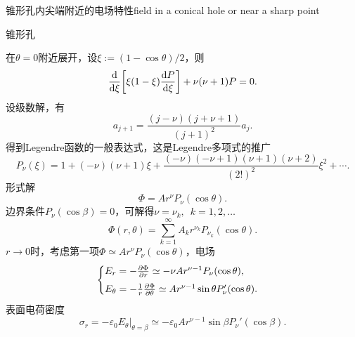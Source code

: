 \begin{example}{锥形孔内尖端附近的电场特性}{field in a conical hole or near a sharp point}
    \begin{center}
        \tikzchap 锥形孔
    \end{center}
    在$\theta=0$附近展开，设$\xi:=(1-\cos\theta)/2$，则 
    \[
        \dd\xi\biggfkh{\xi(1-\xi)\dv P\xi}+\nu(\nu+1)P=0.
    \]
    设级数解，有
    \[
        a_{j+1}=\frac{(j-\nu)(j+\nu+1)}{(j+1)^2}a_j.
    \]
    得到Legendre函数的一般表达式，这是Legendre多项式的推广
    \[
        P_\nu(\xi)=1+(-\nu)(\nu+1)\xi+\frac{(-\nu)(-\nu+1)(\nu+1)(\nu+2)}{(2!)^2}\xi^2+\cdots.
    \]
    形式解
    \[
        \Phi=Ar^\nu P_\nu(\cos\theta).
    \]
    边界条件$P_\nu(\cos\beta)=0$，可解得$\nu=\nu_k,\enspace k=1,2,\ldots$
    \[
        \Phi(r,\theta)=\sum_{k=1}^\infty A_kr^{\nu_k}P_{\nu_k}(\cos\theta).
    \]
    $r\to 0$时，考虑第一项$\Phi\simeq Ar^\nu P_\nu(\cos\theta)$，电场
    \[
        \begin{cases}
            E_r=-\pv\Phi r\simeq-\nu Ar^{\nu-1}P_\nu(\cos\theta),\\[1ex]
            E_\theta=-\frac1r\pv\Phi\theta\simeq Ar^{\nu-1}\sin\theta P'_\nu(\cos\theta).
        \end{cases}
    \]
    表面电荷密度
    \[
        \sigma_r=-\varepsilon_0E_\theta|_{\theta=\beta}\simeq-\varepsilon_0Ar^{\nu-1}\sin\beta P_\nu'(\cos\beta).
    \]
\end{example}
